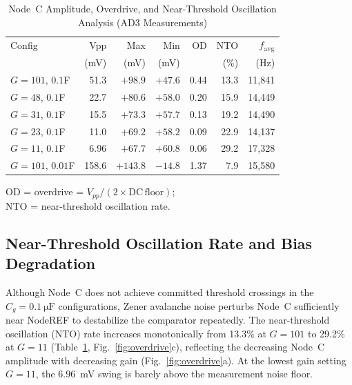\documentclass[conference]{IEEEtran}
\newcommand{\Cg}{\ensuremath{C_g}}
\begin{document}
\begin{table}[t]
\caption{Node~C Amplitude, Overdrive, and Near-Threshold Oscillation Analysis (AD3 Measurements)}
\label{tab:overdrive}
\centering\small
\setlength{\tabcolsep}{3.7pt} 

\begin{threeparttable} 
\begin{tabular}{@{}lrrrrrr@{}}
\toprule
Config & Vpp & Max & Min & OD & NTO & $f_{\text{avg}}$ \\
       & (mV) & (mV)& (mV)&    & (\%)    & (Hz) \\
\midrule
$G\!=\!101$, $0.1$\textmu{}F  & 51.3   & $+98.9$ & $+47.6$ & 0.44 & 13.3 & 11{,}841 \\
$G\!=\!48$, $0.1$\textmu{}F   & 22.7   & $+80.6$ & $+58.0$ & 0.20 & 15.9 & 14{,}449 \\
$G\!=\!31$, $0.1$\textmu{}F   & 15.5   & $+73.3$ & $+57.7$ & 0.13 & 19.2 & 14{,}490 \\
$G\!=\!23$, $0.1$\textmu{}F   & 11.0   & $+69.2$ & $+58.2$ & 0.09 & 22.9 & 14{,}137 \\
$G\!=\!11$, $0.1$\textmu{}F   & 6.96   & $+67.7$ & $+60.8$ & 0.06 & 29.2 & 17{,}328 \\
$G\!=\!101$, $0.01$\textmu{}F & 158.6  & $+143.8$& $-14.8$ & 1.37 & 7.9  & 15{,}580 \\
\bottomrule
\end{tabular}

\begin{tablenotes}
  \footnotesize
  \item[] OD = overdrive = $V_{pp}/(2\!\times\!\mathrm{DC\,floor})$;\\ NTO = near-threshold oscillation rate.
\end{tablenotes}
\end{threeparttable}

\end{table}

\subsection{Near-Threshold Oscillation Rate and Bias Degradation}

Although Node~C does not achieve committed threshold crossings in the
$\Cg=\SI{0.1}{\micro\farad}$ configurations, Zener avalanche noise
perturbs Node~C sufficiently near NodeREF to destabilize the
comparator repeatedly. The near-threshold oscillation (NTO)
rate increases
monotonically from 13.3\% at $G=101$ to 29.2\% at $G=11$
(Table~\ref{tab:overdrive}, Fig.~\ref{fig:overdrive}c), reflecting the
decreasing Node~C amplitude with decreasing gain
(Fig.~\ref{fig:overdrive}a). At the lowest gain setting $G=11$, the \SI{6.96}{\milli\volt}
swing is barely above the measurement noise floor.
\end{document}
